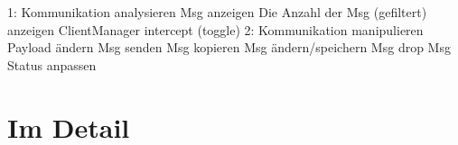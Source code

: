     



    1: Kommunikation analysieren
    	Msg anzeigen
    	Die Anzahl der Msg (gefiltert) anzeigen
    	ClientManager intercept (toggle)
    2: Kommunikation manipulieren
    	Payload ändern
    	Msg senden
    	Msg kopieren
    	Msg ändern/speichern
    	Msg drop
    	Msg Status anpassen


\section{Im Detail}
    

